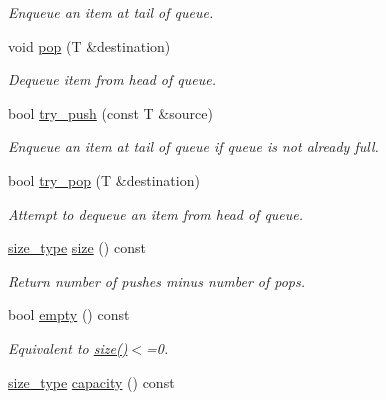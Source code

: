 \begin{DoxyCompactItemize}
\begin{DoxyCompactList}\small\item\em Enqueue an item at tail of queue. \end{DoxyCompactList}\item 
void \hyperlink{classtbb_1_1concurrent__bounded__queue_a87926c31967a918ce80690a9ed5d6fa8}{pop} (T \&destination)
\begin{DoxyCompactList}\small\item\em Dequeue item from head of queue. \end{DoxyCompactList}\item 
bool \hyperlink{classtbb_1_1concurrent__bounded__queue_a03d93a240841a21788396bebd71c51bd}{try\+\_\+push} (const T \&source)
\begin{DoxyCompactList}\small\item\em Enqueue an item at tail of queue if queue is not already full. \end{DoxyCompactList}\item 
bool \hyperlink{classtbb_1_1concurrent__bounded__queue_a3086cb4dcdeee245ef5cf34f72fb3e10}{try\+\_\+pop} (T \&destination)
\begin{DoxyCompactList}\small\item\em Attempt to dequeue an item from head of queue. \end{DoxyCompactList}\item 
\hyperlink{classtbb_1_1concurrent__bounded__queue_ae73fa352d781bdb9d01bfb77f2a8bc28}{size\+\_\+type} \hyperlink{classtbb_1_1concurrent__bounded__queue_a9d6c20fd8c193c12b6a7b0c3101fd966}{size} () const 
\begin{DoxyCompactList}\small\item\em Return number of pushes minus number of pops. \end{DoxyCompactList}\item 
\hypertarget{classtbb_1_1concurrent__bounded__queue_a8c59578f28c5fb4718b0eff43776e879}{}bool \hyperlink{classtbb_1_1concurrent__bounded__queue_a8c59578f28c5fb4718b0eff43776e879}{empty} () const \label{classtbb_1_1concurrent__bounded__queue_a8c59578f28c5fb4718b0eff43776e879}

\begin{DoxyCompactList}\small\item\em Equivalent to \hyperlink{classtbb_1_1concurrent__bounded__queue_a9d6c20fd8c193c12b6a7b0c3101fd966}{size()}$<$=0. \end{DoxyCompactList}\item 
\hypertarget{classtbb_1_1concurrent__bounded__queue_a526487063242569685af8c8d778d39e0}{}\hyperlink{classtbb_1_1concurrent__bounded__queue_ae73fa352d781bdb9d01bfb77f2a8bc28}{size\+\_\+type} \hyperlink{classtbb_1_1concurrent__bounded__queue_a526487063242569685af8c8d778d39e0}{capacity} () const \label{classtbb_1_1concurrent__bounded__queue_a526487063242569685af8c8d778d39e0}


\end{DoxyCompactItemize}
